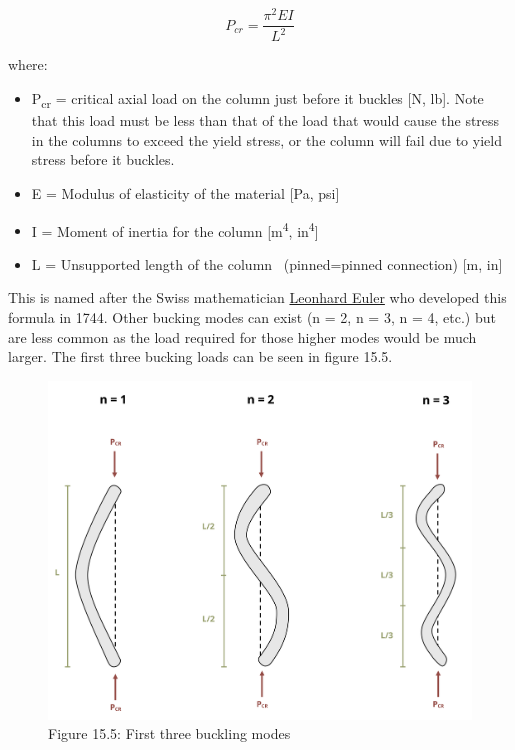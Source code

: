 \documentclass[
  letterpaper,
  DIV=11,
  numbers=noendperiod]{scrreprt}
\begin{document}
\[
P_{c r}=\frac{\pi^2 E I}{L^2}
\]

where:

\begin{itemize}
\item
  P\textsubscript{cr} = critical axial load on the column just before it
  buckles {[}N, lb{]}. Note that this load must be less than that of the
  load that would cause the stress in the columns to exceed the yield
  stress, or the column will fail due to yield stress before it buckles.
\item
  E = Modulus of elasticity of the material {[}Pa, psi{]}
\item
  I = Moment of inertia for the column {[}m\textsuperscript{4},
  in\textsuperscript{4}{]}
\item
  L = Unsupported length of the column~ (pinned=pinned connection) {[}m,
  in{]}
\end{itemize}

This is named after the Swiss mathematician
\href{https://en.wikipedia.org/wiki/Leonhard_Euler}{Leonhard Euler} who
developed this formula in 1744. Other bucking modes can exist (n = 2, n
= 3, n = 4, etc.) but are less common as the load required for those
higher modes would be much larger. The first three bucking loads can be
seen in figure 15.5.

\begin{figure}[H]

{\centering \includegraphics{images/CH15s PNGs/figure 15.5.png}

}

\caption{Figure 15.5: First three buckling modes}

\end{figure}%
\end{document}
